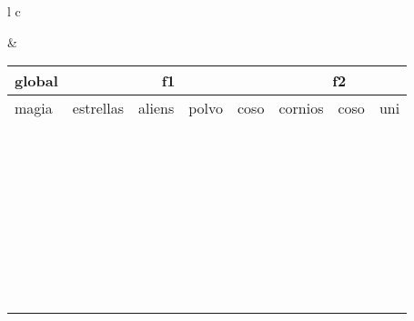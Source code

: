 \begin{tabular}{l c}
\begin{tabularlstlisting}
\end{tabularlstlisting} & 
\begin{tabular}{|l|l|l|l|l|l|l|l|}
    \hline 
    \multicolumn{1}{|c|}{global} & \multicolumn{4}{|c|}{f1} & \multicolumn{3}{|c|}{f2}
    \\ 
    \hline
    magia & estrellas & aliens & polvo & coso & cornios & coso & uni 
    \\
    \hline
    & & & & & & & \\
    \hline
    & & & & & & & \\
    \hline
    & & & & & & & \\
    \hline
    & & & & & & & \\
    \hline
    & & & & & & & \\
    \hline
    & & & & & & & \\
    \hline
    & & & & & & & \\
    \hline
    & & & & & & & \\
    \hline
    & & & & & & & \\
    \hline
    & & & & & & & \\
    \hline
    & & & & & & & \\
    \hline
    & & & & & & & \\
    \hline
    & & & & & & & \\
    \hline
    & & & & & & & \\
    \hline
    & & & & & & & \\
    \hline
    & & & & & & & \\
    \hline
    & & & & & & & \\
    \hline
    & & & & & & & \\
    \hline
    & & & & & & & \\
    \hline
    & & & & & & & \\
    \hline
    & & & & & & & \\
    \hline
    & & & & & & & \\
    \hline
    & & & & & & & \\
    \hline
    & & & & & & & \\
    \hline
    & & & & & & & \\
    \hline
    & & & & & & & \\
    \hline
    & & & & & & & \\
    \hline
    & & & & & & & \\
    \hline
    & & & & & & & \\
    \hline
    & & & & & & & \\
    \hline
    & & & & & & & \\
    \hline
    & & & & & & & \\
    \hline
    & & & & & & & \\
    \hline
    & & & & & & & \\
    \hline
    & & & & & & & \\
    \hline
\end{tabular}
\end{tabular}{}

